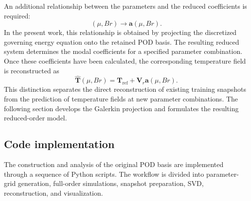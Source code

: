 An additional relationship between the parameters and the
reduced coefficients is required:
\[
\boxed{
(\mu,Br)\longrightarrow\mathbf{a}(\mu,Br).
}
\]
In the present work, this relationship is obtained by
projecting the discretized governing energy equation onto
the retained POD basis. The resulting reduced system
determines the modal coefficients for a specified parameter
combination. Once these coefficients have been calculated,
the corresponding temperature field is reconstructed as
\[
\boxed{
\hat{\mathbf{T}}(\mu,Br)
=
\mathbf{T}_{\mathrm{ref}}
+
\mathbf{V}_r\mathbf{a}(\mu,Br).
}
\]
This distinction separates the direct reconstruction of
existing training snapshots from the prediction of
temperature fields at new parameter combinations. The
following section develops the Galerkin projection and
formulates the resulting reduced-order model.

\subsection{Code implementation}

The construction and analysis of the original POD basis
are implemented through a sequence of Python scripts.
The workflow is divided into parameter-grid generation,
full-order simulations, snapshot preparation, SVD,
reconstruction, and visualization.


